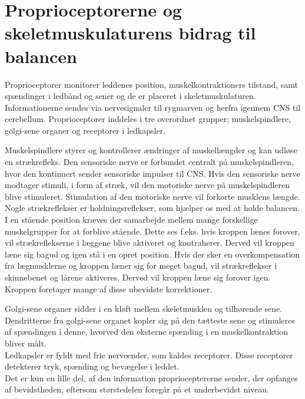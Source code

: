 \section{Proprioceptorerne og skeletmuskulaturens bidrag til balancen}
Proprioceptorer monitorer leddenes position, muskelkontraktioners tilstand, samt spændinger i ledbånd og sener og de er placeret i skeletmuskulaturen. Informationerne sendes via nervesignaler til rygmarven og herfra igennem CNS til cerebellum. Proprioceptorer inddeles i tre overordnet grupper; muskelspindlere, golgi-sene organer og receptorer i ledkapsler.\cite{Martini2012}

Muskelspindlere styrer og kontrollerer ændringer af muskellængder og kan udløse en strækrefleks. Den sensoriske nerve er forbundet centralt på muskelspindleren, hvor den kontinuert sender sensoriske impulser til CNS. Hvis den sensoriske nerve modtager stimuli, i form af stræk, vil den motoriske nerve på muskelspindleren blive stimuleret. Stimulation af den motoriske nerve vil forkorte musklens længde. Nogle strækreflekser er holdningsreflekser, som hjælper os med at holde balancen. I en stående position kræves der samarbejde mellem mange forskellige muskelgrupper for at forblive stående. Dette ses f.eks. hvis kroppen lænes forover, vil strækreflekserne i læggene blive aktiveret og kontraherer. Derved vil kroppen læne sig bagud og igen stå i en opret position. Hvis der sker en overkompensation fra lægmusklerne og kroppen læner sig for meget bagud, vil strækreflekser i skinnebenet og lårene aktiveres. Derved vil kroppen læne sig forover igen. Kroppen foretager mange af disse ubevidste korrektioner. \cite{Martini2012}   %

Golgi-sene organer sidder i en kløft mellem skeletmusklen og tilhørende sene. Dendritterne fra golgi-sene organet kopler sig på den tætteste sene og stimuleres af spændingen i denne, hvorved den eksterne spænding i en muskelkontraktion bliver målt. \cite{Martini2012}    \\
Ledkapsler er fyldt med frie nerveender, som kaldes receptorer. Disse receptorer detekterer tryk, spænding og bevægelse i leddet. \cite{Martini2012}    \\
Det er kun en lille del, af den information proprioceptererne sender, der opfanges af bevidstheden, eftersom størstedelen foregår på et underbevidst niveau.\cite{Martini2012} \\




